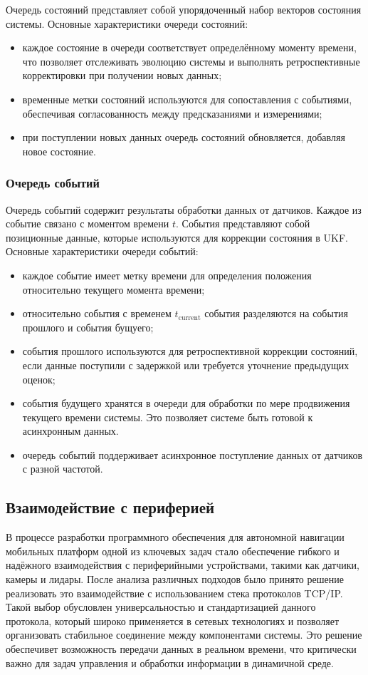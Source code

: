 Очередь состояний представляет собой упорядоченный набор векторов состояния системы.
Основные характеристики очереди состояний:
\begin{itemize}
    \item каждое состояние в очереди соответствует определённому моменту времени, что позволяет отслеживать эволюцию системы и выполнять ретроспективные корректировки при получении новых данных;
    \item временные метки состояний используются для сопоставления с событиями, обеспечивая согласованность между предсказаниями и измерениями;
    \item при поступлении новых данных очередь состояний обновляется, добавляя новое состояние.
\end{itemize}

\subsubsection{Очередь событий}
\label{subsec:event_queue}
\hfill

Очередь событий содержит результаты обработки данных от датчиков. Каждое из событие связано с моментом времени $t$.
События представляют собой позиционные данные, которые используются для коррекции состояния в UKF.
Основные характеристики очереди событий:
\begin{itemize}
    \item каждое событие имеет метку времени для определения положения относительно текущего момента времени;
    \item относительно события с временем $t_{\text{current}}$ события разделяются на события прошлого и события бущуего;
    \item события прошлого используются для ретроспективной коррекции состояний, если данные поступили с задержкой или требуется уточнение предыдущих оценок;
    \item события будущего хранятся в очереди для обработки по мере продвижения текущего времени системы. Это позволяет системе быть готовой к асинхронным данных.
    \item очередь событий поддерживает асинхронное поступление данных от датчиков с разной частотой. 
\end{itemize}

\subsection{Взаимодействие с периферией}
В процессе разработки программного обеспечения для автономной навигации
мобильных платформ одной из ключевых задач стало обеспечение гибкого и надёжного
взаимодействия с периферийными устройствами, такими как датчики, камеры и
лидары. После анализа различных подходов было принято решение реализовать это
взаимодействие с использованием стека протоколов TCP/IP. Такой выбор обусловлен
универсальностью и стандартизацией данного протокола, который широко применяется
в сетевых технологиях и позволяет организовать стабильное соединение между
компонентами системы. Это решение обеспечивет возможность передачи данных в
реальном времени, что критически важно для задач управления и обработки
информации в динамичной среде.

